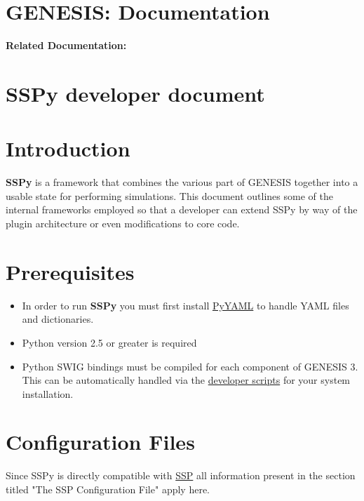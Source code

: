 \documentclass[12pt]{article}
\begin{document}
\section*{GENESIS: Documentation}

{\bf Related Documentation:}

\section*{SSPy developer document}

\section*{Introduction}

	{\bf SSPy} is a framework that combines the various part of GENESIS together into a usable state for performing simulations. This document outlines some of the internal frameworks employed so that a developer can extend SSPy by way of the plugin architecture or even modifications to core code. 

\section*{Prerequisites}

\begin{itemize}
\item In order to run {\bf SSPy} you must first install \href{http://pyyaml.org/}{PyYAML} to handle YAML files and dictionaries.

\item Python version 2.5 or greater is required

\item Python SWIG bindings must be compiled for each component of GENESIS 3. This can be automatically handled via the \href{developer-installation/developer-installation.tex}{developer scripts} for your system installation.
\end{itemize}


\section*{Configuration Files}

Since SSPy is directly compatible with \href{../ssp/ssp.tex}{SSP} all information present in the section titled "The SSP Configuration File" apply here. 
\end{document}
